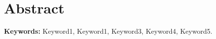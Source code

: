 
\chapter*{Abstract}
\label{chapter:abstract_en}
\vspace*{-10mm}
\lipsum[1-3]

\vfill

\begin{flushleft}
\textbf{Keywords:}
Keyword1, Keyword1, Keyword3, Keyword4, Keyword5.
\end{flushleft}

